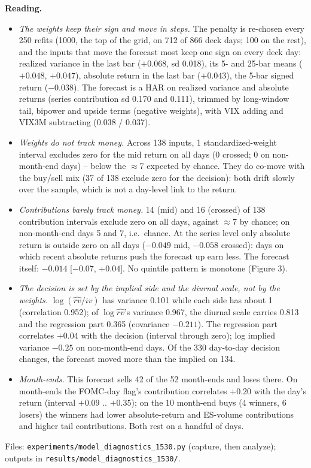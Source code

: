 \documentclass[10pt]{article}
\begin{document}
\textbf{Reading.}
\begin{itemize}\itemsep1pt
\item \emph{The weights keep their sign and move in steps.} The penalty is re-chosen every 250 refits (1000, the top of the grid, on 712 of 866 deck days; 100 on the rest), and the inputs that move the forecast most keep one sign on every deck day: realized variance in the last bar ($+0.068$, sd 0.018), its 5- and 25-bar means ($+0.048$, $+0.047$), absolute return in the last bar ($+0.043$), the 5-bar signed return ($-0.038$). The forecast is a HAR on realized variance and absolute returns (series contribution sd 0.170 and 0.111), trimmed by long-window tail, bipower and upside terms (negative weights), with VIX adding and VIX3M subtracting (0.038 / 0.037).
\item \emph{Weights do not track money.} Across 138 inputs, 1 standardized-weight interval excludes zero for the mid return on all days (0 crossed; 0 on non-month-end days) -- below the $\approx$7 expected by chance. They do co-move with the buy/sell mix (37 of 138 exclude zero for the decision): both drift slowly over the sample, which is not a day-level link to the return.
\item \emph{Contributions barely track money.} 14 (mid) and 16 (crossed) of 138 contribution intervals exclude zero on all days, against $\approx$7 by chance; on non-month-end days 5 and 7, i.e.\ chance. At the series level only absolute return is outside zero on all days ($-0.049$ mid, $-0.058$ crossed): days on which recent absolute returns push the forecast up earn less. The forecast itself: $-0.014$ [$-0.07$, $+0.04$]. No quintile pattern is monotone (Figure 3).
\item \emph{The decision is set by the implied side and the diurnal scale, not by the weights.} $\log(\hat{rv}/iv)$ has variance 0.101 while each side has about 1 (correlation 0.952); of $\log\hat{rv}$'s variance 0.967, the diurnal scale carries 0.813 and the regression part 0.365 (covariance $-0.211$). The regression part correlates $+0.04$ with the decision (interval through zero); log implied variance $-0.25$ on non-month-end days. Of the 330 day-to-day decision changes, the forecast moved more than the implied on 134.
\item \emph{Month-ends.} This forecast sells 42 of the 52 month-ends and loses there. On month-ends the FOMC-day flag's contribution correlates $+0.20$ with the day's return (interval $+0.09$ .. $+0.35$); on the 10 month-end buys (4 winners, 6 losers) the winners had lower absolute-return and ES-volume contributions and higher tail contributions. Both rest on a handful of days.
\end{itemize}
Files: \texttt{experiments/model\_diagnostics\_1530.py} (capture, then analyze); outputs in \texttt{results/model\_diagnostics\_1530/}.
\end{document}
